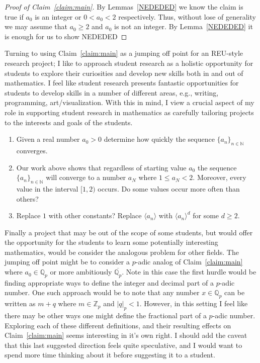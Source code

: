 \documentclass[10pt,reqno]{amsart}
\theoremstyle{remark}
\newcommand{\ideal}[1]{\langle #1 \rangle}
\newcommand{\N}{\mathbb{N}}
\newcommand{\Q}{\mathbb{Q}}
\newcommand{\Z}{\mathbb{Z}}
\begin{document}
\begin{proof}[Proof of Claim~\ref{claim:main}]
By Lemmas~\ref{NEDEDED} we know the claim is true if $a_{0}$ is an integer or $0<a_{0}<2$ respectively. Thus, without lose of generality we may assume that $a_{0}\geq 2$ and $a_{0}$ is not an integer. By Lemma~\ref{NEDEDED}  it is enough for us to show NEDEDED
\end{proof}

Turning to using Claim~\ref{claim:main} as a jumping off point for an REU-style research project; I like to approach student research as a holistic opportunity for students to explore their curiosities and develop new skills both in and out of mathematics. I feel like student research presents fantastic opportunities for students to develop skills in a number of different areas, e.g., writing, programming, art/visualization. With this in mind, I view a crucial aspect of my role in supporting student research in mathematics as carefully tailoring projects to the interests and goals of the students.

\begin{enumerate}
\item Given a real number $a_{0}>0$ determine how quickly the sequence $\{a_{n}\}_{n\in\N}$ converges.
\item Our work above shows that regardless of starting value $a_{0}$ the sequence $\{a_{n}\}_{n\in\N}$ will converge to a number $a_{N}$ where $1\leq a_{N} < 2$. Moreover, every value in the interval $[1,2)$ occurs. Do some values occur more often than others?
\item Replace $1$ with other constants? Replace $\ideal{a_{n}}$ with $\ideal{a_{n}}^{d}$ for some $d\geq2$.
\end{enumerate}

Finally a project that may be out of the scope of some students, but would offer the opportunity for the students to learn some potentially interesting mathematics, would be consider the analogous problem for other fields. The jumping off point might be to consider a $p$-adic analog of Claim~\ref{claim:main} where $a_{0}\in \Q_{p}$ or more ambitiously $\overline{\Q_{p}}$. Note in this case the first hurdle would be finding appropriate ways to define the integer and decimal part of a $p$-adic number. One such approach would be to note that any number $x\in \Q_{p}$ can be written as $m+q$ where $m\in \Z_{p}$ and $|q|_{p}<1$. However, in this setting I feel like there may be other ways one might define the fractional part of a $p$-adic number. Exploring each of these different definitions, and their resulting effects on Claim~\ref{claim:main} seems interesting in it's own right. I should add the caveat that this last suggested direction feels quite speculative, and I would want to spend more time thinking about it before suggesting it to a student. 
\end{document}
